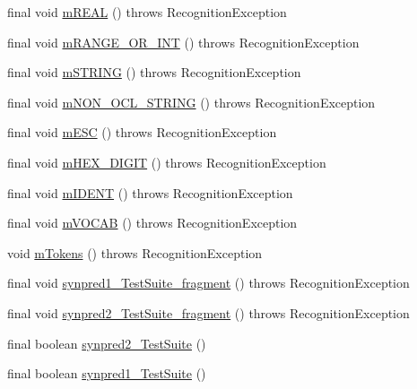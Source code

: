 \begin{DoxyCompactItemize}
\item 
final void \hyperlink{classorg_1_1tzi_1_1use_1_1parser_1_1testsuite_1_1_test_suite_lexer_a90f4d294778d8a41bf9c3a5912582974}{m\-R\-E\-A\-L} ()  throws Recognition\-Exception 
\item 
final void \hyperlink{classorg_1_1tzi_1_1use_1_1parser_1_1testsuite_1_1_test_suite_lexer_ad462a5c77a64aa2897f9f4085771d13f}{m\-R\-A\-N\-G\-E\-\_\-\-O\-R\-\_\-\-I\-N\-T} ()  throws Recognition\-Exception 
\item 
final void \hyperlink{classorg_1_1tzi_1_1use_1_1parser_1_1testsuite_1_1_test_suite_lexer_a74d2336465e238a2e52be13a889219f8}{m\-S\-T\-R\-I\-N\-G} ()  throws Recognition\-Exception 
\item 
final void \hyperlink{classorg_1_1tzi_1_1use_1_1parser_1_1testsuite_1_1_test_suite_lexer_a0bbe5eb3691b8b803b3c0e267f85906e}{m\-N\-O\-N\-\_\-\-O\-C\-L\-\_\-\-S\-T\-R\-I\-N\-G} ()  throws Recognition\-Exception 
\item 
final void \hyperlink{classorg_1_1tzi_1_1use_1_1parser_1_1testsuite_1_1_test_suite_lexer_aedc82937d88f6018ac43aa1db59e4666}{m\-E\-S\-C} ()  throws Recognition\-Exception 
\item 
final void \hyperlink{classorg_1_1tzi_1_1use_1_1parser_1_1testsuite_1_1_test_suite_lexer_a969d0edd78436c57e8eb83d4a5edc1d2}{m\-H\-E\-X\-\_\-\-D\-I\-G\-I\-T} ()  throws Recognition\-Exception 
\item 
final void \hyperlink{classorg_1_1tzi_1_1use_1_1parser_1_1testsuite_1_1_test_suite_lexer_ab82be2d024428b869b1438815e356e1d}{m\-I\-D\-E\-N\-T} ()  throws Recognition\-Exception 
\item 
final void \hyperlink{classorg_1_1tzi_1_1use_1_1parser_1_1testsuite_1_1_test_suite_lexer_ab62a70b1921f47a9bf009becab4ac746}{m\-V\-O\-C\-A\-B} ()  throws Recognition\-Exception 
\item 
void \hyperlink{classorg_1_1tzi_1_1use_1_1parser_1_1testsuite_1_1_test_suite_lexer_ab6b9e4838b18064ded29c3c9bb0fcc88}{m\-Tokens} ()  throws Recognition\-Exception 
\item 
final void \hyperlink{classorg_1_1tzi_1_1use_1_1parser_1_1testsuite_1_1_test_suite_lexer_aea40dc1e9b681d94bdd191254c33a227}{synpred1\-\_\-\-Test\-Suite\-\_\-fragment} ()  throws Recognition\-Exception 
\item 
final void \hyperlink{classorg_1_1tzi_1_1use_1_1parser_1_1testsuite_1_1_test_suite_lexer_a6f65812cabf598847b50bbf679dd5c1b}{synpred2\-\_\-\-Test\-Suite\-\_\-fragment} ()  throws Recognition\-Exception 
\item 
final boolean \hyperlink{classorg_1_1tzi_1_1use_1_1parser_1_1testsuite_1_1_test_suite_lexer_a6ae4ce212322d951c8c424b912741e29}{synpred2\-\_\-\-Test\-Suite} ()
\item 
final boolean \hyperlink{classorg_1_1tzi_1_1use_1_1parser_1_1testsuite_1_1_test_suite_lexer_ab0c566b207c45b664ceddb67ad347105}{synpred1\-\_\-\-Test\-Suite} ()
\end{DoxyCompactItemize}
